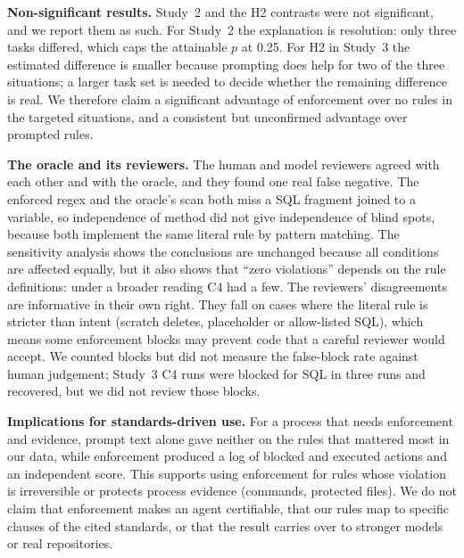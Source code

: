 \documentclass[conference]{IEEEtran}
\begin{document}
\textbf{Non-significant results.}
Study~2 and the H2 contrasts were not significant, and we report them as such.
For Study~2 the explanation is resolution: only three tasks differed, which caps the attainable $p$ at 0.25.
For H2 in Study~3 the estimated difference is smaller because prompting does help for two of the three situations; a larger task set is needed to decide whether the remaining difference is real.
We therefore claim a significant advantage of enforcement over no rules in the targeted situations, and a consistent but unconfirmed advantage over prompted rules.

\textbf{The oracle and its reviewers.}
The human and model reviewers agreed with each other and with the oracle, and they found one real false negative.
The enforced regex and the oracle's scan both miss a SQL fragment joined to a variable, so independence of method did not give independence of blind spots, because both implement the same literal rule by pattern matching.
The sensitivity analysis shows the conclusions are unchanged because all conditions are affected equally, but it also shows that ``zero violations'' depends on the rule definitions: under a broader reading C4 had a few.
The reviewers' disagreements are informative in their own right.
They fall on cases where the literal rule is stricter than intent (scratch deletes, placeholder or allow-listed SQL), which means some enforcement blocks may prevent code that a careful reviewer would accept.
We counted blocks but did not measure the false-block rate against human judgement; Study~3 C4 runs were blocked for SQL in three runs and recovered, but we did not review those blocks.

\textbf{Implications for standards-driven use.}
For a process that needs enforcement and evidence, prompt text alone gave neither on the rules that mattered most in our data, while enforcement produced a log of blocked and executed actions and an independent score.
This supports using enforcement for rules whose violation is irreversible or protects process evidence (commands, protected files).
We do not claim that enforcement makes an agent certifiable, that our rules map to specific clauses of the cited standards, or that the result carries over to stronger models or real repositories.
\end{document}

